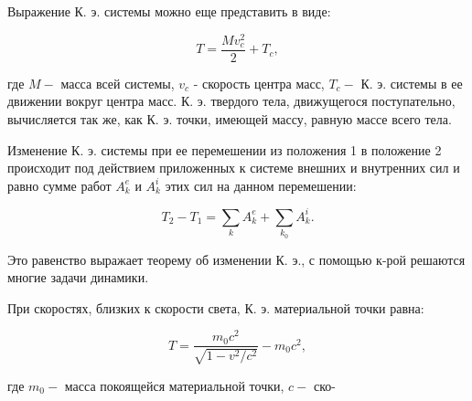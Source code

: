 \documentclass[10pt]{article}
\begin{document}
Выражение К. э. системы можно еще представить в виде:



\[

T=\frac{M v_{c}^{2}}{2}+T_{c},

\]



где $M-$ масса всей системы, $v_{c}$ - скорость центра масс, $T_{c}-$ К. э. системы в ее движении вокруг центра масс. К. э. твердого тела, движущегося поступательно, вычисляется так же, как К. э. точки, имеющей массу, равную массе всего тела.



Изменение К. э. системы при ее перемешении из положения 1 в положение 2 происходит под действием приложенных к системе внешних и внутренних сил и равно сумме работ $A_{k}^{e}$ и $A_{k}^{i}$ этих сил на данном перемешении:



\[

T_{2}-T_{1}=\sum_{k} A_{k}^{e}+\sum_{k_{0}} A_{k}^{i} .

\]



Это равенство выражает теорему об изменении К. э., с помощью к-рой решаются многие задачи динамики.



При скоростях, близких к скорости света, К. э. материальной точки равна:



\[

T=\frac{m_{0} c^{2}}{\sqrt{1-v^{2} / c^{2}}}-m_{0} c^{2},

\]



где $m_{0}-$ масса покоящейся материальной точки, $c-$ ско-
\end{document}
